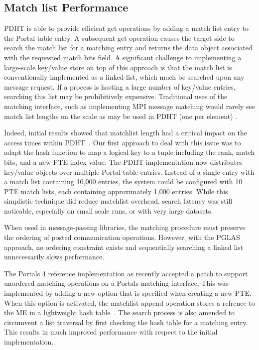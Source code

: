 \subsection{Match list Performance}

PDHT is able to provide efficient get operations by adding a match list entry
to the Portal table entry. A subsequent get operation causes the target side
to search the match list for a matching entry and returns the data object
associated with the requested match bits field. A significant challenge to 
implementing a large-scale key/value store on top of this approach is that
the match list is conventionally implemented as a linked-list, which much be
searched upon any message request. If a process is hosting a large number
of key/value entries, searching this list may be prohibitively expensive.
Traditional uses of the matching interface, such as implementing MPI message
matching would rarely see match list lengths on the scale as may be used in 
PDHT (one per element) \cite{flajslik:16}.

Indeed, initial results showed that matchlist length had a critical 
impact on the access times within PDHT~\cite{comhpc16}. Our first
approach to deal with this issue was to adapt the hash function
to map a logical key to a tuple including the rank, match bits, and 
a new PTE index value. The PDHT implementation now distributes
key/value objects over multiple Portal table entries. Instead of 
a single entry with a match list containing 10,000 entries, the
system could be configured with 10 PTE match lists, each containing
approximately 1,000 entries. While this simplistic technique did
reduce matchlist overhead, search latency was still noticable, 
especially on small scale runs, or with very large datasets.


When used in message-passing libraries, the matching procedure must preserve
the ordering of posted communication operations. However, with the PGLAS
approach, no ordering constraint exists and sequentially searching a linked
list unnecessarily slows performance.

The Portals 4 reference implementation as recently accepted a patch
to support unordered matching operations on a Portals matching interface.
This was implemented by adding a new option that is specified when
creating a new PTE. When this option is activated, the matchlist
append operation stores a refrence to the ME in a lightweight 
hash table~\cite{uthash}.  The search process is also amended to circumvent 
a list traversal by first checking the hash table for a matching entry.
This results in much improved performance with respect to the initial
implementation.

